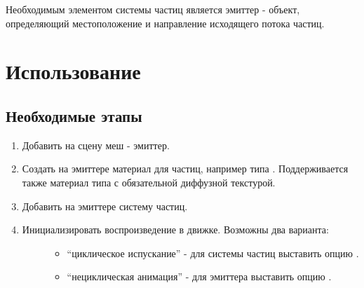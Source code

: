 \documentclass[a4paper,12pt,oneside]{sphinxmanual}
\begin{document}
Необходимым элементом системы частиц является эмиттер - объект, определяющий местоположение и направление исходящего потока частиц.


\section{Использование}
\label{particles:id2}

\subsection{Необходимые этапы}
\label{particles:id3}\begin{enumerate}
\item {} 
Добавить на сцену меш - эмиттер.

\item {} 
Создать на эмиттере материал для частиц, например типа . Поддерживается также материал типа  с обязательной диффузной текстурой.

\item {} 
Добавить на эмиттере систему частиц.

\item {} \begin{description}
\item[{Инициализировать воспроизведение в движке. Возможны два варианта:}] \leavevmode\begin{itemize}
\item {} 
``циклическое испускание'' - для системы частиц выставить опцию .

\item {} 
``нециклическая анимация'' - для эмиттера выставить опцию .

\end{itemize}

\end{description}

\end{enumerate}
\end{document}
